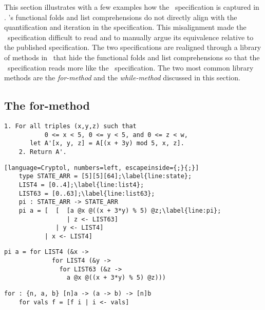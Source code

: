This section illustrates with a few examples how the \fips\ specification is captured in \cryptol. 
\cryptol's functional folds and list comprehensions do not directly align with the quantification and iteration in the specification. 
This misalignment made the \cryptol\ specification difficult to read and to manually argue its equivalence relative to the published specification.
The two specifications are realigned through a library of methods in \cryptol\ that hide the functional folds and list comprehensions so that the \cryptol\ specification reads more like the \fips\ specification. The two most common library methods are the \emph{for-method} and the \emph{while-method} discussed in this section.

\subsection{The for-method}

\newsavebox{\fipsPi}
\begin{lrbox}{\fipsPi}
  \begin{lstlisting}[basewidth = {.5em},basicstyle={\small}]
    1. For all triples (x,y,z) such that 
           0 <= x < 5, 0 <= y < 5, and 0 <= z < w,
       let A'[x, y, z] = A[(x + 3y) mod 5, x, z].
    2. Return A'.
  \end{lstlisting}
\end{lrbox}

\newsavebox{\PiCry}
\begin{lrbox}{\PiCry}
  \begin{lstlisting}[language=Cryptol, numbers=left, escapeinside={;}{;}]
    type STATE_ARR = [5][5][64];\label{line:state};
    LIST4 = [0..4];\label{line:list4};
    LIST63 = [0..63];\label{line:list63};
    pi : STATE_ARR -> STATE_ARR
    pi a = [  [  [a @x @((x + 3*y) % 5) @z;\label{line:pi};
                 | z <- LIST63] 
              | y <- LIST4] 
           | x <- LIST4]
  \end{lstlisting}
\end{lrbox}

\newsavebox{\PiCryLib}
\begin{lrbox}{\PiCryLib}
  \begin{lstlisting}[language=Cryptol]
    pi a = for LIST4 (&x ->
             for LIST4 (&y -> 
               for LIST63 (&z -> 
                 a @x @((x + 3*y) % 5) @z)))
  \end{lstlisting}
\end{lrbox}

\newsavebox{\formethod}
\begin{lrbox}{\formethod}
  \begin{lstlisting}[language=Cryptol]
    for : {n, a, b} [n]a -> (a -> b) -> [n]b
    for vals f = [f i | i <- vals]
  \end{lstlisting}
\end{lrbox}

